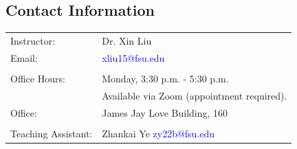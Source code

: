 
\subsection*{Contact Information}

  \noindent\parbox{0.98\textwidth}{%
  \noindent\begin{tabular}{@{}p{}p{}@{}}

\textsf{Instructor:}         &    Dr. Xin Liu           \\
\textsf{Email:}        &    \textcolor{blue}{xliu15@fsu.edu}          \\
\\
\textsf{Office Hours:} &    Monday, 3:30 p.m. - 5:30 p.m.   \\
\textsf{}              &    Available via Zoom (appointment required). \\
\textsf{Office:}       &    James Jay Love Building, 160        \\
\\ 
\textsf{Teaching Assistant:} &  Zhankai Ye \textcolor{blue}{zy22b@fsu.edu}          \\
\end{tabular}}
